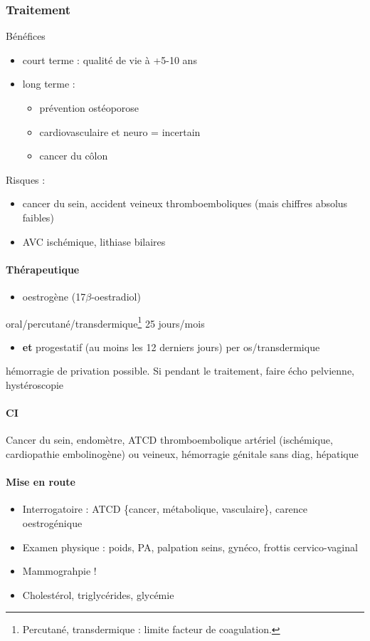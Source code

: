 \documentclass[11pt]{article}
\begin{document}
\subsubsection{Traitement}
\label{sec:org5018736}
Bénéfices
\begin{itemize}
\item court terme : qualité de vie à +5-10 ans
\item long terme :
\begin{itemize}
\item prévention ostéoporose
\item cardiovasculaire et neuro = incertain
\item cancer du côlon
\end{itemize}
\end{itemize}
Risques :
\begin{itemize}
\item \inc cancer du sein, accident veineux thromboemboliques (mais chiffres absolus
faibles)
\item \inc AVC ischémique, lithiase bilaires
\end{itemize}

\paragraph{Thérapeutique}
\label{sec:org10d962c}
\begin{itemize}
\item oestrogène (17\(\beta\)-oestradiol)
\end{itemize}
oral/percutané/transdermique\footnote{Percutané, transdermique : limite \inc facteur de coagulation.} 25 jours/mois
\begin{itemize}
\item \textbf{et} progestatif (au moins les 12 derniers jours) per os/transdermique
\end{itemize}
\danger hémorragie de privation possible. Si pendant le traitement, faire écho
pelvienne, hystéroscopie

\paragraph{CI}
\label{sec:org9abe9ce}
Cancer du sein, endomètre, ATCD thromboembolique artériel (ischémique,
cardiopathie embolinogène) ou veineux, hémorragie génitale sans diag, hépatique

\paragraph{Mise en route}
\label{sec:orgabfc975}
\begin{itemize}
\item Interrogatoire : ATCD \{cancer, métabolique, vasculaire\}, carence oestrogénique
\item Examen physique : poids, PA, palpation seins, gynéco, frottis cervico-vaginal
\item Mammograhpie !
\item Cholestérol, triglycérides, glycémie
\end{itemize}
\end{document}
